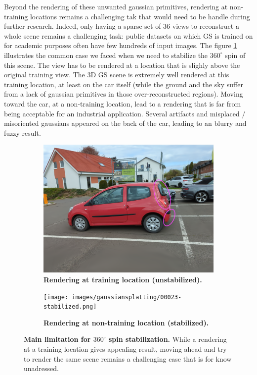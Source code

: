 Beyond the rendering of these unwanted gaussian primitives, rendering at non-training locations remains a challenging tak that would need to be handle during further research. Indeed, only having a sparse set of 36 views to reconstruct a whole scene remains a challenging task: public datasets on which \ac{GS} is trained on for academic purposes often have few hundreds of input images. The figure \ref{fig:nontraining-rendering} illustrates the common case we faced when we need to stabilize the $360^{\circ}$ spin of this scene. The view has to be rendered at a location that is slighly above the original training view. The 3D \ac{GS} scene is extremely well rendered at this training location, at least on the car itself (while the ground and the sky suffer from a lack of gaussian primitives in those over-reconstructed regions). Moving toward the car, at a non-training location, lead to a rendering that is far from being acceptable for an industrial application. Several artifacts and misplaced / misoriented gaussians appeared on the back of the car, leading to an blurry and fuzzy result. 

\begin{figure}[htb!]
  \centering
  \begin{subfigure}[b]{0.45\linewidth}
    \includegraphics[width=\linewidth]{images/gaussiansplatting/00023-unstabilized.png}
    \caption{\textbf{Rendering at training location (unstabilized).}}
  \end{subfigure}
  \quad %
  \begin{subfigure}[b]{0.45\linewidth}
    \texttt{[image: images/gaussiansplatting/00023-stabilized.png]}
    \caption{\textbf{Rendering at non-training location (stabilized).}}
  \end{subfigure}
  \caption{\textbf{Main limitation for $360^{\circ}$ spin stabilization.} While a rendering at a training location gives appealing result, moving ahead and try to render the same scene remains a challenging case that is for know unadressed.}
  \label{fig:nontraining-rendering}
\end{figure}

